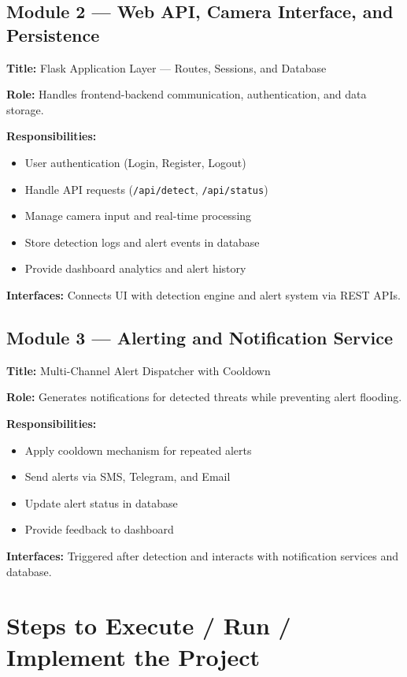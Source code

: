 \documentclass[10pt,openany]{report}
\begin{document}
\begin{sloppypar}
{{{\begin{sloppypar}
\subsection{Module 2 — Web API, Camera Interface, and Persistence}
\textbf{Title:} Flask Application Layer — Routes, Sessions, and Database

\textbf{Role:}  
Handles frontend-backend communication, authentication, and data storage.

\textbf{Responsibilities:}
\begin{itemize}
    \item User authentication (Login, Register, Logout)
    \item Handle API requests (\texttt{/api/detect}, \texttt{/api/status})
    \item Manage camera input and real-time processing
    \item Store detection logs and alert events in database
    \item Provide dashboard analytics and alert history
\end{itemize}

\textbf{Interfaces:}  
Connects UI with detection engine and alert system via REST APIs.

\subsection{Module 3 — Alerting and Notification Service}
\textbf{Title:} Multi-Channel Alert Dispatcher with Cooldown

\textbf{Role:}  
Generates notifications for detected threats while preventing alert flooding.

\textbf{Responsibilities:}
\begin{itemize}
    \item Apply cooldown mechanism for repeated alerts
    \item Send alerts via SMS, Telegram, and Email
    \item Update alert status in database
    \item Provide feedback to dashboard
\end{itemize}

\textbf{Interfaces:}  
Triggered after detection and interacts with notification services and database.
\section{Steps to Execute / Run / Implement the Project}


\end{sloppypar}}}}
\end{sloppypar}
\end{document}
